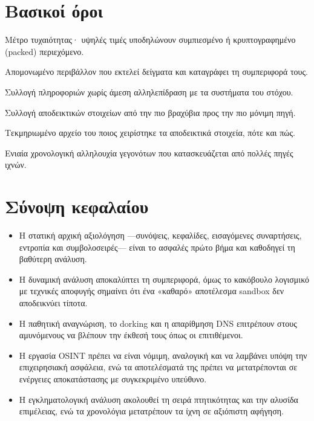 \documentclass[11pt,openany]{book}
\begin{document}
\section*{Βασικοί όροι}
\begin{description}[style=nextline,leftmargin=1.2em]
  \item[Εντροπία] Μέτρο τυχαιότητας· υψηλές τιμές υποδηλώνουν συμπιεσμένο ή κρυπτογραφημένο (packed) περιεχόμενο.
  \item[Sandbox] Απομονωμένο περιβάλλον που εκτελεί δείγματα και καταγράφει τη συμπεριφορά τους.
  \item[Παθητική αναγνώριση] Συλλογή πληροφοριών χωρίς άμεση αλληλεπίδραση με τα συστήματα του στόχου.
  \item[Σειρά πτητικότητας] Συλλογή αποδεικτικών στοιχείων από την πιο βραχύβια προς την πιο μόνιμη πηγή.
  \item[Αλυσίδα επιμέλειας] Τεκμηριωμένο αρχείο του ποιος χειρίστηκε τα αποδεικτικά στοιχεία, πότε και πώς.
  \item[Υπερ-χρονολόγιο] Ενιαία χρονολογική αλληλουχία γεγονότων που κατασκευάζεται από πολλές πηγές ιχνών.
\end{description}

\section*{Σύνοψη κεφαλαίου}
\begin{itemize}
  \item Η στατική αρχική αξιολόγηση —συνόψεις, κεφαλίδες, εισαγόμενες συναρτήσεις, εντροπία και συμβολοσειρές— είναι το ασφαλές πρώτο βήμα και καθοδηγεί τη βαθύτερη ανάλυση.
  \item Η δυναμική ανάλυση αποκαλύπτει τη συμπεριφορά, όμως το κακόβουλο λογισμικό με τεχνικές αποφυγής σημαίνει ότι ένα «καθαρό» αποτέλεσμα sandbox δεν αποδεικνύει τίποτα.
  \item Η παθητική αναγνώριση, το dorking και η απαρίθμηση DNS επιτρέπουν στους αμυνόμενους να βλέπουν την έκθεσή τους όπως οι επιτιθέμενοι.
  \item Η εργασία OSINT πρέπει να είναι νόμιμη, αναλογική και να λαμβάνει υπόψη την επιχειρησιακή ασφάλεια, ενώ τα αποτελέσματά της πρέπει να μετατρέπονται σε ενέργειες αποκατάστασης με συγκεκριμένο υπεύθυνο.
  \item Η εγκληματολογική ανάλυση ακολουθεί τη σειρά πτητικότητας και την αλυσίδα επιμέλειας, ενώ τα χρονολόγια μετατρέπουν τα ίχνη σε αξιόπιστη αφήγηση.
\end{itemize}
\end{document}
